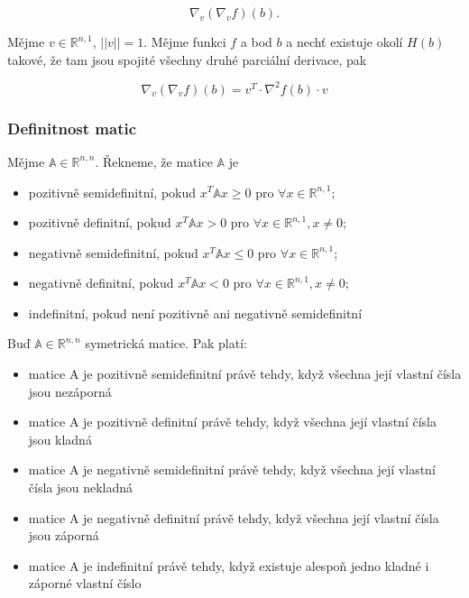 \begin{equation}
    \nabla_v(\nabla_v f)(b).
\end{equation}

Mějme $v \in \mathbb{R}^{n,1}$, $||v|| = 1$. Mějme funkci $f$ a bod $b$ a nechť existuje okolí $H(b)$ takové, že tam jsou spojité všechny druhé parciální derivace, pak

\begin{equation}
    \nabla_v(\nabla_v f)(b) = v^T \cdot \nabla^2 f(b) \cdot v
\end{equation}

\subsubsection{Definitnost matic}

Mějme $\mathbb{A} \in \mathbb{R}^{n,n}$. Řekneme, že matice $\mathbb{A}$ je

\begin{itemize}
    \item pozitivně semidefinitní, pokud $x^T \mathbb{A} x \geq 0$ pro $\forall x \in \mathbb{R}^{n,1}$;
    \item pozitivně definitní, pokud $x^T \mathbb{A} x > 0$ pro $\forall x \in \mathbb{R}^{n,1}, x \neq 0$;
    \item negativně semidefinitní, pokud $x^T \mathbb{A} x \leq 0$ pro $\forall x \in \mathbb{R}^{n,1}$;
    \item negativně definitní, pokud $x^T \mathbb{A} x < 0$ pro $\forall x \in \mathbb{R}^{n,1}, x \neq 0$;
    \item indefinitní, pokud není pozitivně ani negativně semidefinitní
\end{itemize}

\newpage

\noindent Buď $\mathbb{A} \in \mathbb{R}^{n,n}$ symetrická matice. Pak platí:
\begin{itemize}
    \item matice A je pozitivně semidefinitní právě tehdy, když všechna její vlastní čísla jsou nezáporná
    \item matice A je pozitivně definitní právě tehdy, když všechna její vlastní čísla jsou kladná
    \item matice A je negativně semidefinitní právě tehdy, když všechna její vlastní čísla jsou nekladná
    \item matice A je negativně definitní právě tehdy, když všechna její vlastní čísla jsou záporná
    \item matice A je indefinitní právě tehdy, když existuje alespoň jedno kladné i záporné vlastní číslo
\end{itemize}

